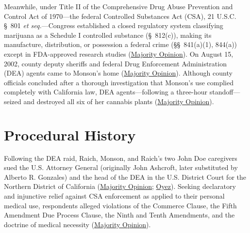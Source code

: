 \documentclass[12pt]{article}
\begin{document}
Meanwhile, under Title II of the Comprehensive Drug Abuse Prevention and Control Act of 1970---the federal Controlled Substances Act (CSA), 21 U.S.C. \S\ 801 \textit{et seq.}---Congress established a closed regulatory system classifying marijuana as a Schedule I controlled substance (\S\ 812(c)), making its manufacture, distribution, or possession a federal crime (\S\S\ 841(a)(1), 844(a)) except in FDA-approved research studies (\href{https://www.law.cornell.edu/supct/html/03-1454.ZO.html}{Majority Opinion}). On August 15, 2002, county deputy sheriffs and federal Drug Enforcement Administration (DEA) agents came to Monson's home (\href{https://www.law.cornell.edu/supct/html/03-1454.ZO.html}{Majority Opinion}). Although county officials concluded after a thorough investigation that Monson's use complied completely with California law, DEA agents---following a three-hour standoff---seized and destroyed all six of her cannabis plants (\href{https://www.law.cornell.edu/supct/html/03-1454.ZO.html}{Majority Opinion}).

\section{Procedural History}

Following the DEA raid, Raich, Monson, and Raich's two John Doe caregivers sued the U.S. Attorney General (originally John Ashcroft, later substituted by Alberto R. Gonzales) and the head of the DEA in the U.S. District Court for the Northern District of California (\href{https://www.law.cornell.edu/supct/html/03-1454.ZO.html}{Majority Opinion}; \href{https://www.oyez.org/cases/2004/03-1454}{Oyez}). Seeking declaratory and injunctive relief against CSA enforcement as applied to their personal medical use, respondents alleged violations of the Commerce Clause, the Fifth Amendment Due Process Clause, the Ninth and Tenth Amendments, and the doctrine of medical necessity (\href{https://www.law.cornell.edu/supct/html/03-1454.ZO.html}{Majority Opinion}).
\end{document}
